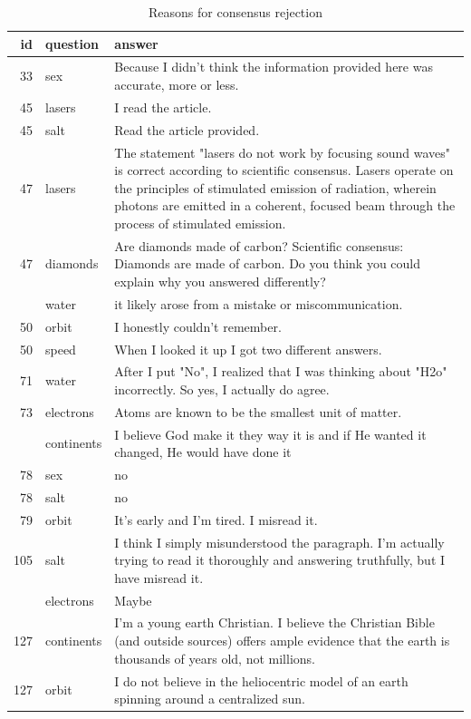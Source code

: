 \documentclass[
  doc,floatsintext]{apa6}
\begin{document}
\begin{longtable}[t]{>{}r>{}l>{\raggedright\arraybackslash}p{30em}}
\caption{\label{tab:exp2-reasons-rejection}Reasons for consensus rejection}\\
\toprule
id & question & answer\\
\midrule
33 & sex & Because I didn't think the information provided here was accurate, more or less.\\
45 & lasers & I read the article.\\
45 & salt & Read the article provided.\\
47 & lasers & The statement "lasers do not work by focusing sound waves" is correct according to scientific consensus. Lasers operate on the principles of stimulated emission of radiation, wherein photons are emitted in a coherent, focused beam through the process of stimulated emission.\\
47 & diamonds & Are diamonds made of carbon? Scientific consensus: Diamonds are made of carbon.  Do you think you could explain why you answered differently?\\
\addlinespace
47 & water & it likely arose from a mistake or miscommunication.\\
50 & orbit & I honestly couldn't remember.\\
50 & speed & When I looked it up I got two different answers.\\
71 & water & After I put "No", I realized that I was thinking about "H2o" incorrectly. So yes, I actually do agree.\\
73 & electrons & Atoms are known to be the smallest unit of matter.\\
\addlinespace
77 & continents & I believe God make it they way it is and if He wanted it changed, He would have done it\\
78 & sex & no\\
78 & salt & no\\
79 & orbit & It’s early and I’m tired. I misread it.\\
105 & salt & I think I simply misunderstood the paragraph. I'm actually trying to read it thoroughly and answering truthfully, but I have misread it.\\
\addlinespace
109 & electrons & Maybe\\
127 & continents & I'm a young earth Christian. I believe the Christian Bible (and outside sources) offers ample evidence that the earth is thousands of years old, not millions.\\
127 & orbit & I do not believe in the heliocentric model of an earth spinning around a centralized sun.\\

\end{longtable}
\end{document}

